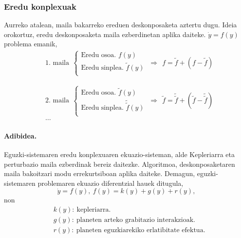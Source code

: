 \subsubsection*{Eredu konplexuak}
Aurreko atalean, maila bakarreko ereduen deskonposaketa aztertu dugu. Ideia orokortuz, eredu deskonposaketa maila ezberdinetan aplika daiteke.  $\dot{y} =f(y)$ problema emanik, 
\begin{align*}
&\mbox{1. maila} \ \
\left \{ \begin{array}{c}
  \mbox{Eredu osoa.   } f(y) \\[.25cm]
  \mbox{Eredu sinplea.    } \tilde{f}(y)  \\
\end{array} \right.
\ \Rightarrow \ \
f =\tilde{f}+(f-\tilde{f})  
\end{align*}

\begin{align*}
&\mbox{2. maila} \ \
\left \{ \begin{array}{c}
  \mbox{Eredu osoa.   }\tilde{f}(y) \\[.25cm]
  \mbox{Eredu sinplea.    }\tilde{\tilde{f}}(y)  \\
\end{array} \right.
\ \Rightarrow \ \
\tilde{f} =\tilde{\tilde{f}}+({\tilde{f}}-\tilde{\tilde{f}})\\
&\dots  
\end{align*}

\paragraph*{Adibidea.}
Eguzki-sistemaren eredu konplexuaren ekuazio-sisteman, alde Kepleriarra eta perturbazio maila ezberdinak bereiz daitezke. Algoritmoa, deskonposaketaren maila bakoitzari modu errekurtsiboan aplika daiteke. Demagun, eguzki-sistemaren problemaren ekuazio diferentzial hauek ditugula,
\begin{equation*}
\dot{y}=f(y), \ f(y)=k(y)+g(y)+r(y),
\end{equation*}
non
\begin{align*}
&k(y): \ \text{kepleriarra.}\\
&g(y): \ \text{planeten arteko grabitazio interakzioak.}\\
&r(y): \ \text{planeten eguzkiarekiko erlatibitate efektua.}
\end{align*}

